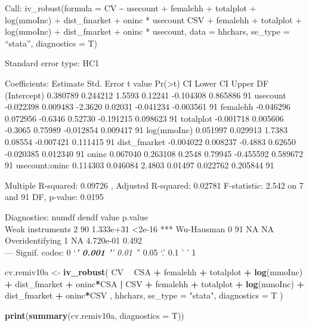 \documentclass[
]{article}
\newenvironment{Shaded}{\begin{snugshade}}{\end{snugshade}}
\newcommand{\DataTypeTok}[1]{\textcolor[rgb]{0.13,0.29,0.53}{#1}}
\newcommand{\KeywordTok}[1]{\textcolor[rgb]{0.13,0.29,0.53}{\textbf{#1}}}
\newcommand{\NormalTok}[1]{#1}
\newcommand{\OperatorTok}[1]{\textcolor[rgb]{0.81,0.36,0.00}{\textbf{#1}}}
\newcommand{\StringTok}[1]{\textcolor[rgb]{0.31,0.60,0.02}{#1}}
\begin{document}
Call: iv\_robust(formula = CV \textasciitilde{} usecount + femalehh +
totalplot + log(mmoInc) + dist\_fmarket + oninc * usecount \textbar{}
CSV + femalehh + totalplot + log(mmoInc) + dist\_fmarket + oninc *
usecount, data = hhchars, se\_type = ``stata'', diagnostics = T)

Standard error type: HC1

Coefficients: Estimate Std. Error t value
Pr(\textgreater\textbar t\textbar) CI Lower CI Upper DF (Intercept)
0.380789 0.244212 1.5593 0.12241 -0.104308 0.865886 91 usecount
-0.022398 0.009483 -2.3620 0.02031 -0.041234 -0.003561 91 femalehh
-0.046296 0.072956 -0.6346 0.52730 -0.191215 0.098623 91 totalplot
-0.001718 0.005606 -0.3065 0.75989 -0.012854 0.009417 91 log(mmoInc)
0.051997 0.029913 1.7383 0.08554 -0.007421 0.111415 91 dist\_fmarket
-0.004022 0.008237 -0.4883 0.62650 -0.020385 0.012340 91 oninc 0.067040
0.263108 0.2548 0.79945 -0.455592 0.589672 91 usecount:oninc 0.114303
0.046084 2.4803 0.01497 0.022762 0.205844 91

Multiple R-squared: 0.09726 , Adjusted R-squared: 0.02781 F-statistic:
2.542 on 7 and 91 DF, p-value: 0.0195

Diagnostics: numdf dendf value p.value\\
Weak instruments 2 90 1.333e+31 \textless2e-16 *** Wu-Hausman 0 91 NA
NA\\
Overidentifying 1 NA 4.720e-01 0.492\\
--- Signif. codes: 0 `\emph{\textbf{' 0.001 '}' 0.01 '}' 0.05 `.' 0.1 '
' 1

\begin{Shaded}
\begin{Highlighting}[]
\NormalTok{cv.remiv10a <-}
\StringTok{  }\KeywordTok{iv_robust}\NormalTok{(}
\NormalTok{    CV }\OperatorTok{~}\StringTok{ }\NormalTok{CSA }\OperatorTok{+}\StringTok{ }\NormalTok{femalehh }\OperatorTok{+}\StringTok{ }\NormalTok{totalplot }\OperatorTok{+}\StringTok{ }\KeywordTok{log}\NormalTok{(mmoInc) }\OperatorTok{+}\StringTok{ }\NormalTok{dist_fmarket }\OperatorTok{+}\StringTok{ }\NormalTok{oninc}\OperatorTok{*}\NormalTok{CSA }\OperatorTok{|}
\StringTok{      }\NormalTok{CSV }\OperatorTok{+}\StringTok{ }\NormalTok{femalehh }\OperatorTok{+}\StringTok{ }\NormalTok{totalplot }\OperatorTok{+}\StringTok{ }\KeywordTok{log}\NormalTok{(mmoInc) }\OperatorTok{+}\StringTok{ }\NormalTok{dist_fmarket }\OperatorTok{+}\StringTok{ }\NormalTok{oninc}\OperatorTok{*}\NormalTok{CSV ,}
\NormalTok{    hhchars,}
    \DataTypeTok{se_type =} \StringTok{"stata"}\NormalTok{,}
    \DataTypeTok{diagnostics =}\NormalTok{ T}
\NormalTok{  )}

\KeywordTok{print}\NormalTok{(}\KeywordTok{summary}\NormalTok{(cv.remiv10a, }\DataTypeTok{diagnostics =}\NormalTok{ T))}
\end{Highlighting}
\end{Shaded}
\end{document}
